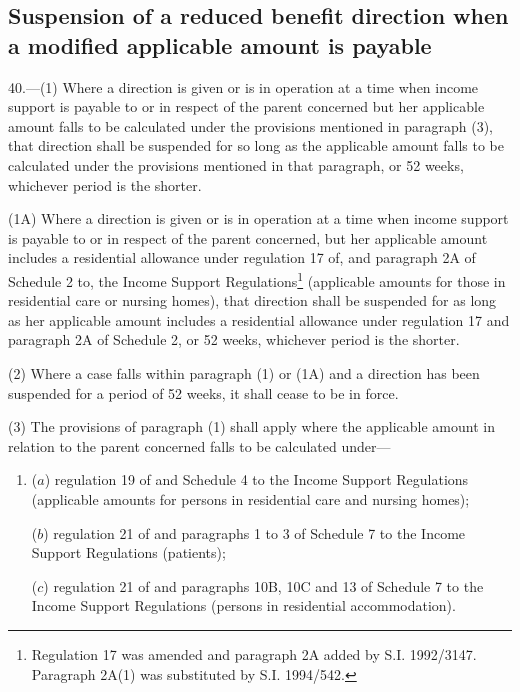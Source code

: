 \documentclass[a4paper]{article}
\begin{document}
\subsection[40. Suspension of a reduced benefit direction when a modified applicable amount is payable]{Suspension of a reduced benefit direction when a modified applicable amount is payable}

40.—(1) Where a direction is given or is in operation at a time when income support is payable to or in respect of the parent concerned but her applicable amount falls to be calculated under the provisions mentioned in paragraph (3), that direction shall be suspended for so long as the applicable amount falls to be calculated under the provisions mentioned in that paragraph, or 52 weeks, whichever period is the shorter.

(1A) Where a direction is given or is in operation at a time when income support is payable to or in respect of the parent concerned, but her applicable amount includes a residential allowance under regulation 17 of, and paragraph 2A of Schedule 2 to, the Income Support Regulations\footnote{\frenchspacing Regulation 17 was amended and paragraph 2A added by S.I. 1992/3147. Paragraph 2A(1) was substituted by S.I. 1994/542.} (applicable amounts for those in residential care or nursing homes), that direction shall be suspended for as long as her applicable amount includes a residential allowance under regulation 17 and paragraph 2A of Schedule 2, or 52 weeks, whichever period is the shorter.

(2) Where a case falls within paragraph (1) 
or (1A)  %
and a direction has been suspended for a period of 52 weeks, it shall cease to be in force.

(3) The provisions of paragraph (1) shall apply where the applicable amount in relation to the parent concerned falls to be calculated under—
\begin{enumerate}\item[]
($a$) regulation 19 of and Schedule 4 to the Income Support Regulations (applicable amounts for persons in residential care and nursing homes);

($b$) regulation 21 of and paragraphs 1 to 3 of Schedule 7 to the Income Support Regulations (patients);

($c$) regulation 21 of and paragraphs 10B, 10C
and 13 of Schedule 7 to the Income Support Regulations (persons in residential accommodation).
\end{enumerate}
\end{document}
